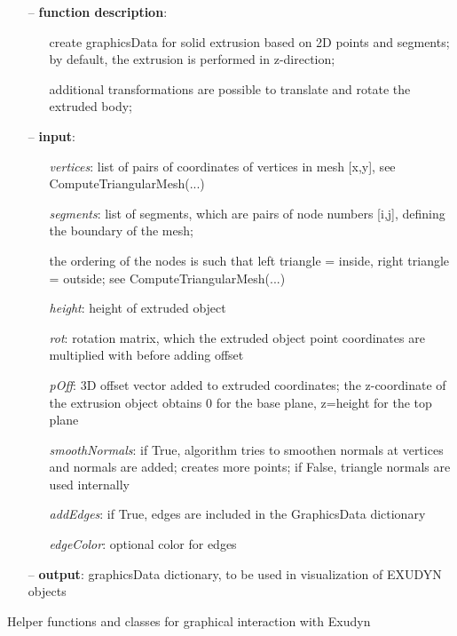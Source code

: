 \begin{itemize}[leftmargin=1.4cm]
\begin{itemize}[leftmargin=1.4cm]
\begin{itemize}[leftmargin=0.5cm]
\begin{itemize}[leftmargin=1.4cm]
\begin{itemize}[leftmargin=1.4cm]
\begin{itemize}[leftmargin=0.5cm]
\begin{itemize}[leftmargin=1.4cm]
\begin{itemize}[leftmargin=0.5cm]
\begin{itemize}[leftmargin=0.7cm]
\item[--]{\bf function description}: \vspace{-6pt}
\begin{itemize}[leftmargin=1.2cm]
\setlength{\itemindent}{-0.7cm}
\item[]create graphicsData for solid extrusion based on 2D points and segments; by default, the extrusion is performed in z-direction;
\item[]additional transformations are possible to translate and rotate the extruded body;
\end{itemize}
\item[--]{\bf input}: \vspace{-6pt}
\begin{itemize}[leftmargin=1.2cm]
\setlength{\itemindent}{-0.7cm}
\item[]{\it vertices}: list of pairs of coordinates of vertices in mesh [x,y], see ComputeTriangularMesh(...)
\item[]{\it segments}: list of segments, which are pairs of node numbers [i,j], defining the boundary of the mesh;
\item[]the ordering of the nodes is such that left triangle = inside, right triangle = outside; see ComputeTriangularMesh(...)
\item[]{\it height}:   height of extruded object
\item[]{\it rot}:      rotation matrix, which the extruded object point coordinates are multiplied with before adding offset
\item[]{\it pOff}:     3D offset vector added to extruded coordinates; the z-coordinate of the extrusion object obtains 0 for the base plane, z=height for the top plane
\item[]{\it smoothNormals}: if True, algorithm tries to smoothen normals at vertices and normals are added; creates more points; if False, triangle normals are used internally
\item[]{\it addEdges}: if True, edges are included in the GraphicsData dictionary
\item[]{\it edgeColor}: optional color for edges
\end{itemize}
\item[--]{\bf output}: graphicsData dictionary, to be used in visualization of EXUDYN objects
\vspace{12pt}\end{itemize}
%
\label{sec:module:GUI}
  Helper functions and classes for graphical interaction with Exudyn
\begin{itemize}[leftmargin=1.4cm]

\end{itemize}
\end{itemize}
\end{itemize}
\end{itemize}
\end{itemize}
\end{itemize}
\end{itemize}
\end{itemize}
\end{itemize}
